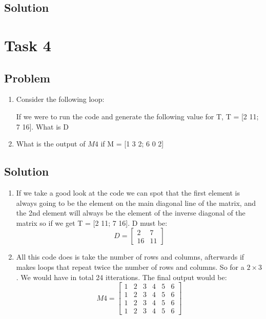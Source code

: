 \documentclass[a4paper, 10pt]{article}
\begin{document}
		\subsection{Solution}
	
	\section{Task 4}
	
		\subsection{Problem}
			\begin{enumerate}
				\item
					\noindent Consider the following loop:
					
					
					\noindent If we were to run the code and generate the following value for T, T = [2 11; 7 16]. What is D
				\item 
					What is the output of $M4$ if M = [1 3 2; 6 0 2]
					
			\end{enumerate}
		\subsection{Solution}
			\begin{enumerate}
				\item 
					If we take a good look at the code we can spot that the first element is always going to be the element on the main diagonal line of the matrix, and the 2nd element will always be the element of the inverse diagonal of the matrix so if we get T = [2 11; 7 16]. D must be:
					\[D = \begin{bmatrix}
						2  & 7 \\
						16 & 11
					\end{bmatrix}\]
				\item 
					All this code does is take the number of rows and columns, afterwards if makes loops that repeat twice the number of rows and columns. So for a $2 \times 3$. We would have in total 24 itterations. The final output would be:
					\[M4 = \begin{bmatrix}
						1  & 2 & 3 & 4 & 5 & 6 \\
						1  & 2 & 3 & 4 & 5 & 6 \\
						1  & 2 & 3 & 4 & 5 & 6 \\
						1  & 2 & 3 & 4 & 5 & 6 
					\end{bmatrix}\]
					
			\end{enumerate}
		\pagebreak
\end{document}
